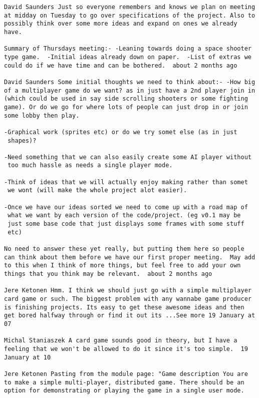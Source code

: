 \begin{verbatim}
David Saunders Just so everyone remembers and knows we plan on meeting
at midday on Tuesday to go over specifications of the project. Also to
possibly think over some more ideas and expand on ones we already
have.

Summary of Thursdays meeting:- -Leaning towards doing a space shooter
type game.  -Initial ideas already down on paper.  -List of extras we
could do if we have time and can be bothered.  about 2 months ago

David Saunders Some initial thoughts we need to think about:- -How big
of a multiplayer game do we want? as in just have a 2nd player join in
(which could be used in say side scrolling shooters or some fighting
game). Or do we go for where lots of people can just drop in or join
some lobby then play.

-Graphical work (sprites etc) or do we try somet else (as in just
 shapes)?

-Need something that we can also easily create some AI player without
 too much hassle as needs a single player mode.

-Think of ideas that we will actually enjoy making rather than somet
 we wont (will make the whole project alot easier).

-Once we have our ideas sorted we need to come up with a road map of
 what we want by each version of the code/project. (eg v0.1 may be
 just some base code that just displays some frames with some stuff
 etc)

No need to answer these yet really, but putting them here so people
can think about them before we have our first proper meeting.  May add
to this when I think of more things, but feel free to add your own
things that you think may be relevant.  about 2 months ago 

Jere Ketonen Hmm. I think we should just go with a simple multiplayer
card game or such. The biggest problem with any wannabe game producer
is finishing projects. Its easy to get these awesome ideas and then
get bored halfway through or find it out its ...See more 19 January at
07

Michal Staniaszek A card game sounds good in theory, but I have a
feeling that we won't be allowed to do it since it's too simple.  19
January at 10

Jere Ketonen Pasting from the module page: "Game description You are
to make a simple multi-player, distributed game. There should be an
option for demonstrating or playing the game in a single user mode.


\end{verbatim}
